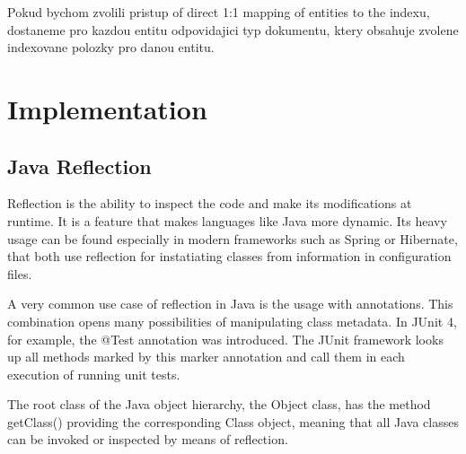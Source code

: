 \documentclass[12pt, oneside, a4paper]{book}
\begin{document}
Pokud bychom zvolili pristup of direct 1:1 mapping of entities to the indexu,
dostaneme pro kazdou entitu odpovidajici typ dokumentu, ktery obsahuje
zvolene indexovane polozky pro danou entitu. 


\chapter{Implementation}


\section{Java Reflection}

Reflection is the ability to inspect the code and make its modifications at runtime. It is a feature that makes languages like Java more dynamic. Its heavy usage can be found especially in modern frameworks such as Spring or Hibernate, that both use reflection for instatiating classes from information in configuration files. 

A very common use case of reflection in Java is the usage with annotations. This combination opens many possibilities of manipulating class metadata. In JUnit 4, for example, the @Test annotation was introduced. The JUnit framework looks up all methods marked by this marker annotation and call them in each execution of running unit tests.

The root class of the Java object hierarchy, the Object class, has the method getClass() providing the corresponding Class object, meaning that all Java classes can be invoked or inspected by means of reflection.
\end{document}
